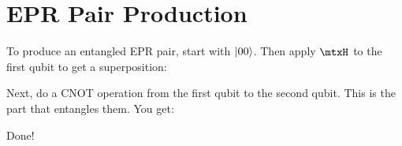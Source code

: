 \section{EPR Pair Production}

\begin{example}
  To produce an entangled EPR pair, start with $|00\rangle$. Then apply
  $\mtxH$ to the first qubit to get a superposition:

  \begin{nedqn}
    \parens{\sqtot}  \otimes {}
  \end{nedqn}

  \noindent
  Next, do a CNOT operation from the first qubit to the second qubit.
  This is the part that entangles them. You get:

  \begin{nedqn}
    \parens{\sqtot} 
  \end{nedqn}

  \noindent
  Done!
\end{example}

